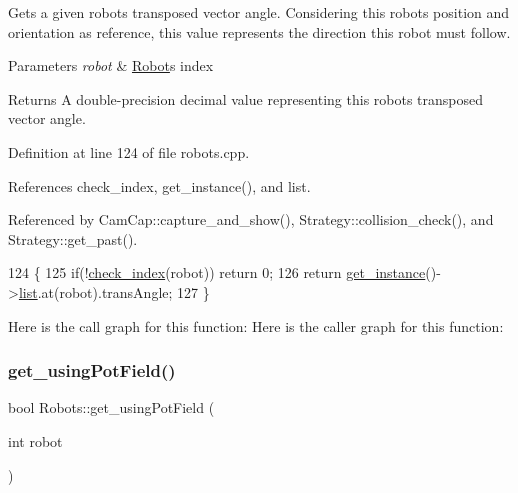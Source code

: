 Gets a given robot\textquotesingle{}s transposed vector angle. Considering this robot\textquotesingle{}s position and orientation as reference, this value represents the direction this robot must follow. 
\begin{DoxyParams}{Parameters}
{\em robot} & \hyperlink{struct_robots_1_1_robot}{Robot}\textquotesingle{}s index \\
\hline
\end{DoxyParams}
\begin{DoxyReturn}{Returns}
A double-\/precision decimal value representing this robot\textquotesingle{}s transposed vector angle. 
\end{DoxyReturn}


Definition at line 124 of file robots.\+cpp.



References check\+\_\+index, get\+\_\+instance(), and list.



Referenced by Cam\+Cap\+::capture\+\_\+and\+\_\+show(), Strategy\+::collision\+\_\+check(), and Strategy\+::get\+\_\+past().


\begin{DoxyCode}
124                                        \{
125     \textcolor{keywordflow}{if}(!\hyperlink{robots_8hpp_ae3e6ae8f87cdc750c0b99bc609d9ae43}{check\_index}(robot)) \textcolor{keywordflow}{return} 0;
126     \textcolor{keywordflow}{return} \hyperlink{class_robots_a589bce74db5f34af384952d48435168f}{get\_instance}()->\hyperlink{class_robots_a2c6b77265028f82a4342ca1ef15ed305}{list}.at(robot).transAngle;
127 \}
\end{DoxyCode}
Here is the call graph for this function\+:
Here is the caller graph for this function\+:
\mbox{\label{class_robots_a42f3e3d3b1d8c41ad6180a03427458bf}} 
\subsubsection{\texorpdfstring{get\+\_\+using\+Pot\+Field()}{get\_usingPotField()}}
{\footnotesize\ttfamily bool Robots\+::get\+\_\+using\+Pot\+Field (\begin{DoxyParamCaption}\item[{int}]{robot }\end{DoxyParamCaption})\hspace{0.3cm}{\ttfamily [static]}}

